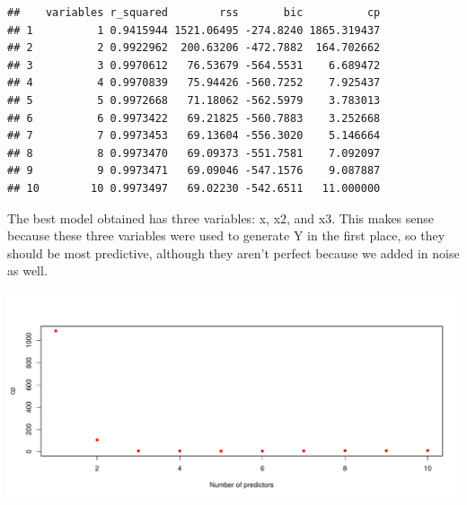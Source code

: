 \documentclass[]{article}
\newenvironment{Shaded}{\begin{snugshade}}{\end{snugshade}}
\newcommand{\KeywordTok}[1]{\textcolor[rgb]{0.13,0.29,0.53}{\textbf{#1}}}
\newcommand{\DataTypeTok}[1]{\textcolor[rgb]{0.13,0.29,0.53}{#1}}
\newcommand{\DecValTok}[1]{\textcolor[rgb]{0.00,0.00,0.81}{#1}}
\newcommand{\StringTok}[1]{\textcolor[rgb]{0.31,0.60,0.02}{#1}}
\newcommand{\CommentTok}[1]{\textcolor[rgb]{0.56,0.35,0.01}{\textit{#1}}}
\newcommand{\OperatorTok}[1]{\textcolor[rgb]{0.81,0.36,0.00}{\textbf{#1}}}
\newcommand{\NormalTok}[1]{#1}
\begin{document}
\begin{verbatim}
##    variables r_squared        rss       bic          cp
## 1          1 0.9415944 1521.06495 -274.8240 1865.319437
## 2          2 0.9922962  200.63206 -472.7882  164.702662
## 3          3 0.9970612   76.53679 -564.5531    6.689472
## 4          4 0.9970839   75.94426 -560.7252    7.925437
## 5          5 0.9972668   71.18062 -562.5979    3.783013
## 6          6 0.9973422   69.21825 -560.7883    3.252668
## 7          7 0.9973453   69.13604 -556.3020    5.146664
## 8          8 0.9973470   69.09373 -551.7581    7.092097
## 9          9 0.9973471   69.09046 -547.1576    9.087887
## 10        10 0.9973497   69.02230 -542.6511   11.000000
\end{verbatim}

The best model obtained has three variables: x, x2, and x3. This makes
sense because these three variables were used to generate Y in the first
place, so they should be most predictive, although they aren't perfect
because we added in noise as well.

\begin{Shaded}
\end{Shaded}

\includegraphics{hw2_fall18_files/figure-latex/unnamed-chunk-4-1.pdf}

\begin{Shaded}
\end{Shaded}
\end{document}
